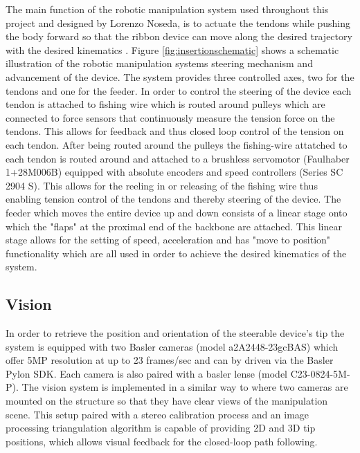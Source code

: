 The main function of the robotic manipulation system used throughout this project and designed by Lorenzo Noseda, is to actuate the tendons while pushing the body forward so that the ribbon device can move along the desired trajectory with the desired kinematics \cite{noseda_flat_2024}. 
\newline \newline
Figure \ref{fig:insertionschematic} shows a schematic illustration of the robotic manipulation systems steering mechanism and advancement of the device. The system provides three controlled axes, two for the tendons and one for the feeder. 
\newline \newline 
In order to control the steering of the device each tendon is attached to fishing wire which is routed around pulleys which are connected to force sensors  that continuously measure the tension force on the tendons. This allows for feedback and thus closed loop control of the tension on each tendon. After being routed around the pulleys the fishing-wire attatched to each tendon is routed around and attached to a brushless servomotor (Faulhaber 1+28M006B) equipped with absolute encoders and speed controllers (Series SC 2904 S). This allows for the reeling in or releasing of the fishing wire thus enabling tension control of the tendons and thereby steering of the device. 
\newline \newline
The feeder which moves the entire device up and down consists of a linear stage  onto which the "flaps" at the proximal end of the backbone are attached. This linear stage allows for the setting of speed, acceleration and has "move to position" functionality which are all used in order to achieve the desired kinematics of the system.


\subsection{Vision}
In order to retrieve the position and orientation of the steerable device's tip the system is equipped with two Basler cameras (model a2A2448-23gcBAS) which offer 5MP resolution at up to 23 frames/sec and can by driven via the Basler Pylon SDK. Each camera is also paired with a basler lense (model C23-0824-5M-P). The vision system is implemented in a similar way to \cite{dalvand_high_2016} where two cameras are mounted on the structure so that they have clear views of the manipulation scene. This setup paired with a stereo calibration process and an image processing triangulation algorithm is capable of providing 2D and 3D tip positions, which allows visual feedback for the closed-loop path following.

